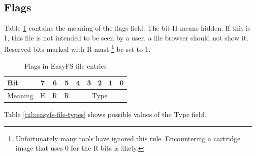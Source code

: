 \documentclass[a4paper,oneside]{memoir}
\begin{document}
\subsection{Flags}

Table \ref{tab:easyfs-flags} contains the meaning of the flags field. The bit H
means hidden. If this is 1, this file is not intended to be seen by a user, a
file browser should not show it. Reserved bits marked with R must
\footnote{Unfortunately many tools have ignored this rule.
Encountering a cartridge image that uses 0 for the R bits is likely.}
be set to 1.

\begin{table}[!htbp]
    \centering
    \begin{tabularx}{0.6\textwidth}{X|c|c|c|c|c|c|c|c}
        \toprule
        Bit     & 7 & 6 & 5 & 4 & 3 & 2 & 1 & 0 \\
        \midrule
        Meaning & H & R & R & \multicolumn{5}{c}{Type} \\
        \bottomrule
    \end{tabularx}
    \caption{Flags in EasyFS file entries}
    \label{tab:easyfs-flags}
\end{table}

Table \ref{tab:easyfs-file-types} shows possible values of the Type field.
\end{document}

